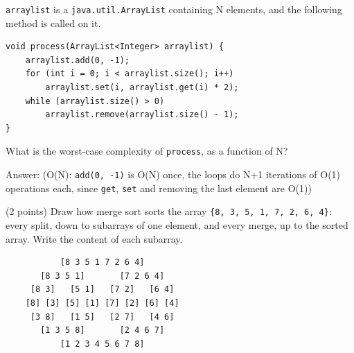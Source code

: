 \begin{question}
\lstinline|arraylist| is a \lstinline|java.util.ArrayList| containing N elements, and the following method is called on it.

\begin{lstlisting}
void process(ArrayList<Integer> arraylist) {
    arraylist.add(0, -1);
    for (int i = 0; i < arraylist.size(); i++)
        arraylist.set(i, arraylist.get(i) * 2);
    while (arraylist.size() > 0)
        arraylist.remove(arraylist.size() - 1);
}
\end{lstlisting}

What is the worst-case complexity of \lstinline|process|, as a function of N?

Answer: \underline{\hspace{1in}} \ifanswers (O(N): \lstinline|add(0, -1)| is O(N) once, the loops do N+1 iterations of O(1) operations each, since \lstinline|get|, \lstinline|set| and removing the last element are O(1))\fi
\end{question}

\begin{question}
(2 points) Draw how merge sort sorts the array \lstinline|{8, 3, 5, 1, 7, 2, 6, 4}|:
every split, down to subarrays of one element, and every merge, up to the sorted array.
Write the content of each subarray.

\ifanswers
\begin{verbatim}
           [8 3 5 1 7 2 6 4]
       [8 3 5 1]       [7 2 6 4]
     [8 3]   [5 1]   [7 2]   [6 4]
    [8] [3] [5] [1] [7] [2] [6] [4]
     [3 8]   [1 5]   [2 7]   [4 6]
       [1 3 5 8]       [2 4 6 7]
           [1 2 3 4 5 6 7 8]
\end{verbatim}
\else
\vspace{3in}
\fi
\end{question}
